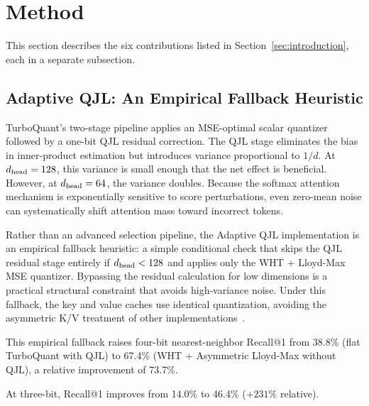 
\section{Method}
\label{sec:method}

This section describes the six contributions listed in
Section~\ref{sec:introduction}, each in a separate subsection.

\subsection{Adaptive QJL: An Empirical Fallback Heuristic}
\label{sec:method:adaptive}

TurboQuant's two-stage pipeline applies an MSE-optimal scalar quantizer followed by a one-bit QJL residual correction. The QJL stage eliminates the bias in inner-product estimation but introduces variance proportional to $1/d$. At $d_{\text{head}} = 128$, this variance is small enough that the net effect is beneficial. However, at $d_{\text{head}} = 64$, the variance doubles. Because the softmax attention mechanism is exponentially sensitive to score perturbations, even zero-mean noise can systematically shift attention mass toward incorrect tokens.

Rather than an advanced selection pipeline, the Adaptive QJL implementation is an empirical fallback heuristic: a simple conditional check that skips the QJL residual stage entirely if $d_{\text{head}} < 128$ and applies only the WHT + Lloyd-Max MSE quantizer. Bypassing the residual calculation for low dimensions is a practical structural constraint that avoids high-variance noise. Under this fallback, the key and value caches use identical quantization, avoiding the asymmetric K/V treatment of other implementations~\cite{amesianx2025turboquant}.

This empirical fallback raises four-bit nearest-neighbor Recall@1 from 38.8\% (flat TurboQuant with QJL) to 67.4\% (WHT + Asymmetric Lloyd-Max without QJL), a relative improvement of 73.7\%.

At three-bit, Recall@1 improves from 14.0\% to 46.4\% ($+231\%$
relative).

